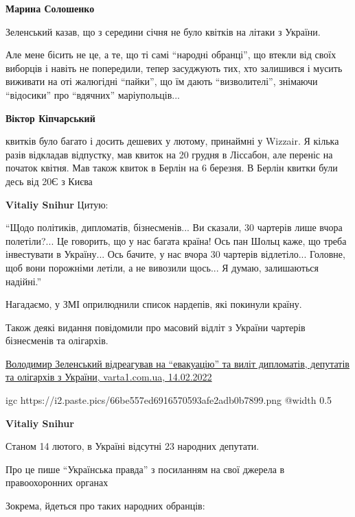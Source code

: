 \begin{itemize} %
\textbf{Марина Солошенко} 

Зеленський казав, що з середини січня не було квітків на літаки з України.

Але мене бісить не це, а те, що ті самі \enquote{народні обранці}, що втекли від своїх
виборців і навіть не попередили, тепер засуджують тих, хто залишився і мусить
виживати на оті жалюгідні \enquote{пайки}, що їм дають \enquote{визволителі}, знімаючи
\enquote{відосики} про \enquote{вдячних} маріупольців...

\textbf{Віктор Кіпчарський} 

квитків було багато і досить дешевих у лютому, принаймні у Wizzair. Я кілька
разів відкладав відпустку, мав квиток на 20 грудня в Ліссабон, але переніс на
початок квітня. Мав також квиток в Берлін на 6 березня. В Берлін квитки були
десь від 20Є з Києва

\textbf{Vitaliy Snihur} Цитую:

\enquote{Щодо політиків, дипломатів, бізнесменів... Ви сказали, 30 чартерів лише вчора
полетіли?... Це говорить, що у нас багата країна! Ось пан Шольц каже, що треба
інвестувати в Україну... Ось бачите, у нас вчора 30 чартерів відлетіло...
Головне, щоб вони порожніми летіли, а не вивозили щось... Я думаю, залишаються
надійні.}

Нагадаємо, у ЗМІ оприлюднили список нардепів, які покинули країну.

Також деякі видання повідомили про масовий відліт з України чартерів
бізнесменів та олігархів.

\href{https://varta1.com.ua/news/volodimir-zelenskiy-vidreaguvav-na-evakuaciyu-ta-vilit-diplomativ-deputativ-ta-oligarhiv-z-ukrayini_341215.html}{%
Володимир Зеленський відреагував на \enquote{евакуацію} та виліт дипломатів, депутатів та олігархів з України, %
varta1.com.ua, 14.02.2022%
}

\ifcmt
  igc https://i2.paste.pics/66be557ed6916570593afe2adb0b7899.png
	@width 0.5
\fi

\textbf{Vitaliy Snihur} 

Станом 14 лютого, в Україні відсутні 23 народних депутати.

Про це пише \enquote{Українська правда} з посиланням на свої джерела в правоохоронних органах

Зокрема, йдеться про таких народних обранців:


\end{itemize}
